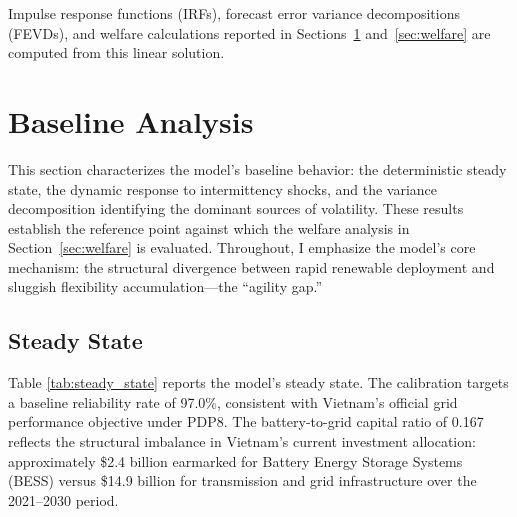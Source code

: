 \documentclass[12pt, a4paper]{article}
\begin{document}
Impulse response functions (IRFs), forecast error variance decompositions (FEVDs), and welfare calculations reported in Sections~\ref{sec:results} and~\ref{sec:welfare} are computed from this linear solution.

\section{Baseline Analysis} \label{sec:results}

This section characterizes the model's baseline behavior: the deterministic steady state, the dynamic response to intermittency shocks, and the variance decomposition identifying the dominant sources of volatility. These results establish the reference point against which the welfare analysis in Section~\ref{sec:welfare} is evaluated. Throughout, I emphasize the model's core mechanism: the structural divergence between rapid renewable deployment and sluggish flexibility accumulation---the ``agility gap.''

\subsection{Steady State}

Table \ref{tab:steady_state} reports the model's steady state. The calibration targets a baseline reliability rate of 97.0\%, consistent with Vietnam's official grid performance objective under PDP8. The battery-to-grid capital ratio of 0.167 reflects the structural imbalance in Vietnam's current investment allocation: approximately \$2.4 billion earmarked for Battery Energy Storage Systems (BESS) versus \$14.9 billion for transmission and grid infrastructure over the 2021--2030 period.
\end{document}

